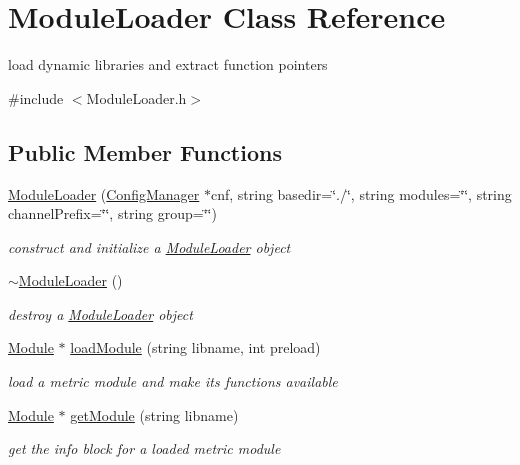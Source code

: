 \hypertarget{classModuleLoader}{}\section{Module\+Loader Class Reference}
\label{classModuleLoader}


load dynamic libraries and extract function pointers  




{\ttfamily \#include $<$Module\+Loader.\+h$>$}

\subsection*{Public Member Functions}
\begin{DoxyCompactItemize}
\item 
\hyperlink{classModuleLoader_ab7ab1224836096260ae1a325941fe24c}{Module\+Loader} (\hyperlink{classConfigManager}{Config\+Manager} $\ast$cnf, string basedir=\char`\"{}./\char`\"{}, string modules=\char`\"{}\char`\"{}, string channel\+Prefix=\char`\"{}\char`\"{}, string group=\char`\"{}\char`\"{})
\begin{DoxyCompactList}\small\item\em construct and initialize a \hyperlink{classModuleLoader}{Module\+Loader} object \end{DoxyCompactList}\item 
\hyperlink{classModuleLoader_a79d95bc9360ee001972bb1990d37b1a5}{$\sim$\+Module\+Loader} ()
\begin{DoxyCompactList}\small\item\em destroy a \hyperlink{classModuleLoader}{Module\+Loader} object \end{DoxyCompactList}\item 
\hyperlink{classModule}{Module} $\ast$ \hyperlink{classModuleLoader_a494036ae2850f065ea0676f5b2351093}{load\+Module} (string libname, int preload)
\begin{DoxyCompactList}\small\item\em load a metric module and make its functions available \end{DoxyCompactList}\item 
\hyperlink{classModule}{Module} $\ast$ \hyperlink{classModuleLoader_ac39cac913d2201252c2501664c9926f7}{get\+Module} (string libname)
\begin{DoxyCompactList}\small\item\em get the info block for a loaded metric module \end{DoxyCompactList}\item 

\end{DoxyCompactItemize}
